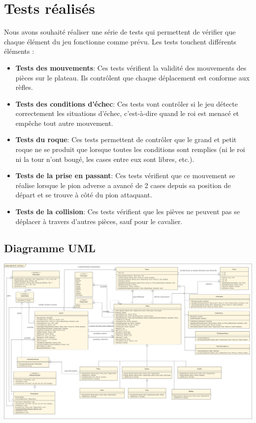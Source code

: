 \documentclass[12pt]{article}
\begin{document}
\section{Tests réalisés}
Nous avons souhaité réaliser une série de tests qui permettent de vérifier que chaque élément du jeu fonctionne comme prévu. Les tests touchent différents éléments :

\begin{itemize}
    \item \textbf{Tests des mouvements}: Ces tests vérifient la validité des mouvements des pièces sur le plateau. Ils contrôlent que chaque déplacement est conforme aux rèfles.
    \item \textbf{Tests des conditions d'échec}: Ces tests vont contrôler si le jeu détecte correctement les situations d'échec, c'est-à-dire quand le roi est menacé et empêche tout autre mouvement.
    \item \textbf{Tests du roque}: Ces tests permettent de contrôler que le grand et petit roque ne se produit que lorsque toutes les conditions sont remplies (ni le roi ni la tour n'ont bougé, les cases entre eux sont libres, etc.).
    \item \textbf{Tests de la prise en passant}: Ces tests vérifient que ce mouvement se réalise lorsque le pion adverse a avancé de 2 cases depuis sa position de départ et se trouve à côté du pion attaquant.
    \item \textbf{Tests de la collision}: Ces tests vérifient que les pièves ne peuvent pas se déplacer à travers d'autres pièces, sauf pour le cavalier.

\end{itemize}

\begin{landscape}
\thispagestyle{empty}
\newpage
\section{Diagramme UML}
\includegraphics[width=20cm]{uml.png}
\newpage
\end{landscape}
\end{document}
